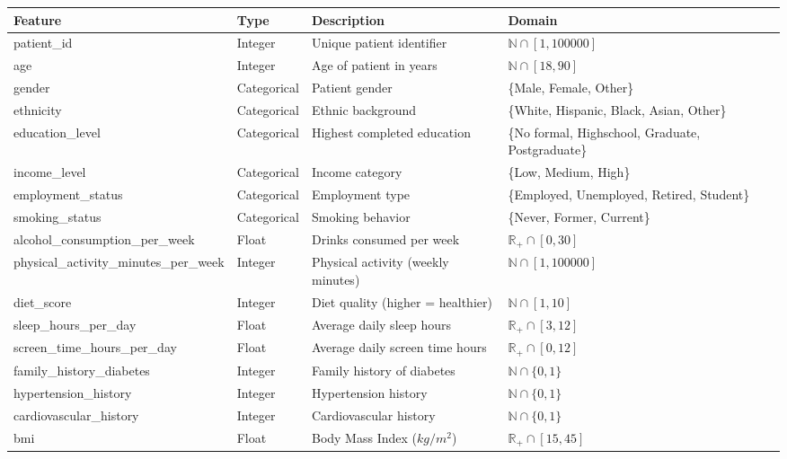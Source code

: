 \documentclass[a4paper]{article}
\begin{document}
\begin{table}[H]
	\centering
	\small
	\begin{tabular}{|l|l|p{5cm}|p{4cm}|}
		\hline
		\textbf{Feature} & \textbf{Type} & \textbf{Description} & \textbf{Domain} \\
		\hline
		patient\_id & Integer & Unique patient identifier & $\mathbb{N} \cap [1, 100000]$ \\
		\hline
		age & Integer & Age of patient in years & $\mathbb{N} \cap [18, 90]$ \\
		\hline
		gender & Categorical & Patient gender & \{Male, Female, Other\} \\
		\hline
		ethnicity & Categorical & Ethnic background & \{White, Hispanic, Black, Asian, Other\} \\
		\hline
		education\_level & Categorical & Highest completed education & \{No formal, Highschool, Graduate, Postgraduate\} \\
		\hline
		income\_level & Categorical & Income category & \{Low, Medium, High\} \\
		\hline
		employment\_status & Categorical & Employment type & \{Employed, Unemployed, Retired, Student\} \\
		\hline
		smoking\_status & Categorical & Smoking behavior & \{Never, Former, Current\} \\
		\hline
		alcohol\_consumption\_per\_week & Float & Drinks consumed per week & $\mathbb{R_+} \cap [0, 30]$ \\
		\hline
		physical\_activity\_minutes\_per\_week & Integer & Physical activity (weekly minutes) & $\mathbb{N} \cap [1, 100000]$ \\
		\hline
		diet\_score & Integer & Diet quality (higher = healthier) & $\mathbb{N} \cap [1, 10]$ \\
		\hline
		sleep\_hours\_per\_day & Float & Average daily sleep hours & $\mathbb{R_+} \cap [3, 12]$ \\
		\hline
		screen\_time\_hours\_per\_day & Float & Average daily screen time hours & $\mathbb{R_+} \cap [0, 12]$ \\
		\hline
		family\_history\_diabetes & Integer & Family history of diabetes & $\mathbb{N} \cap \{0, 1\}$ \\
		\hline
		hypertension\_history & Integer & Hypertension history & $\mathbb{N} \cap \{0, 1\}$ \\
		\hline
		cardiovascular\_history & Integer & Cardiovascular history & $\mathbb{N} \cap \{0, 1\}$ \\
		\hline
		bmi & Float & Body Mass Index ($kg/m^2$) & $\mathbb{R_+} \cap [15, 45]$ \\

\end{tabular}
\end{table}
\end{document}
